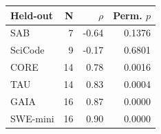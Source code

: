 \begin{tabular}{lrrr}
\toprule
Held-out & N & $\rho$ & Perm. $p$ \\
\midrule
SAB & 7 & -0.64 & 0.1376 \\
SciCode & 9 & -0.17 & 0.6801 \\
CORE & 14 & 0.78 & 0.0016 \\
TAU & 14 & 0.83 & 0.0004 \\
GAIA & 16 & 0.87 & 0.0000 \\
SWE-mini & 16 & 0.90 & 0.0000 \\
\bottomrule
\end{tabular}
